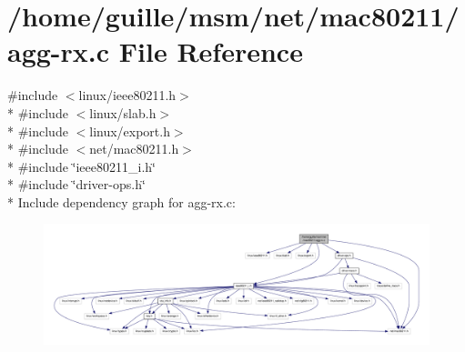 \hypertarget{agg-rx_8c}{\section{/home/guille/msm/net/mac80211/agg-\/rx.c File Reference}
\label{agg-rx_8c}
}
{\ttfamily \#include $<$linux/ieee80211.\-h$>$}\\*
{\ttfamily \#include $<$linux/slab.\-h$>$}\\*
{\ttfamily \#include $<$linux/export.\-h$>$}\\*
{\ttfamily \#include $<$net/mac80211.\-h$>$}\\*
{\ttfamily \#include \char`\"{}ieee80211\-\_\-i.\-h\char`\"{}}\\*
{\ttfamily \#include \char`\"{}driver-\/ops.\-h\char`\"{}}\\*
Include dependency graph for agg-\/rx.c\-:
\nopagebreak
\begin{figure}[H]
\begin{center}
\leavevmode
\includegraphics[width=350pt]{agg-rx_8c__incl}
\end{center}
\end{figure}

